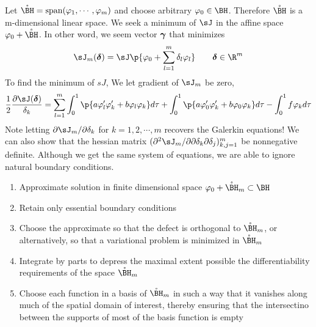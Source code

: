 \documentclass[11pt]{article}
\begin{document}
\begin{definition*}
     Let $\mathring{\BH} = \text{span}(\varphi_1,\cdots,\varphi_m)$ and choose arbitrary $\varphi_0 \in \BH$. Therefore $\mathring{\BH}$ is a m-dimensional linear space. We seek a minimum of $\sJ$ in the affine space $\varphi_0 + \mathring{\BH}$. In other word, we seem vector $\boldsymbol{\gamma}$ that minimizes 
    \[
        \sJ_m(\boldsymbol{\delta}) = \sJ \p{
            \varphi_0 + \sum_{l=1}^m \delta_l \varphi_l
        }
        \quad \quad \boldsymbol{\delta} \in \R^m
    \]
    To find the minimum of $sJ$, We let gradient of $\sJ_m$ be zero,
    \[
        \frac{1}{2} \frac{\partial \sJ(\boldsymbol{\delta})}{\delta_k} 
        = \sum_{l=1}^m \int_0^1 \p{a\varphi_l'\varphi_k' + b\varphi_l \varphi_k} d\tau 
        + \int_0^1 \p{a\varphi_0'\varphi_k' + b\varphi_0\varphi_k} d\tau
        - \int_0^1 f\varphi_k d\tau  
    \]
    Note letting $\partial \sJ_m / \partial \delta_k$ for $k=1,2,\cdots,m$ recovers the Galerkin equations! We can also show that the hessian matrix $(\partial^2 \sJ_m / \partial \partial \delta_k \partial \delta_j)_{k,j=1}^m$ be nonnegative definite. Although we get the same system of equations, we are able to ignore natural boundary conditions.
\end{definition*}
 

\begin{definition*}
    \begin{enumerate}
        \item Approximate solution in finite dimensional space $\varphi_0 + \mathring{\BH}_m \subset \BH$
        \item Retain only essential boundary conditions
        \item Choose the approximate so that the defect is orthogonal to $\mathring{\BH}_m$, or alternatively, so that a variational problem is minimized in $\mathring{\BH}_m$
        \item Integrate by parts to depress the maximal extent possible the differentiability requirements of the space $\mathring{\BH}_m$ 
        \item Choose each function in a basis of $\mathring{\BH}_m$ in such a way that it vanishes along much of the spatial domain of interest, thereby ensuring that the intersectino between the supports of most of the basis function is empty
    \end{enumerate}
\end{definition*}
\end{document}
